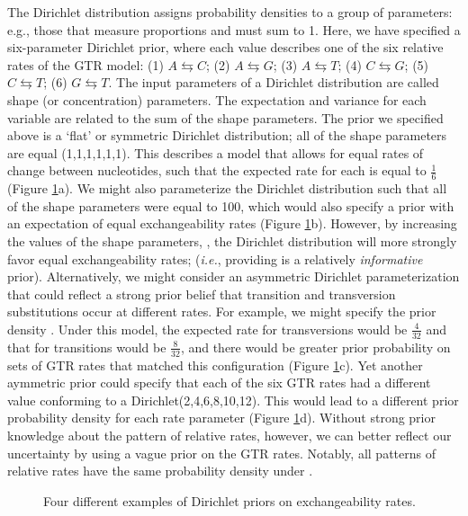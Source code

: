 The Dirichlet distribution assigns probability densities to a group of parameters: e.g., those that measure proportions and must sum to 1. 
Here, we have specified a six-parameter Dirichlet prior, where each value describes one of the six relative rates of the GTR model: 
(1) $A\leftrightarrows C$; (2) $A\leftrightarrows G$; (3) $A\leftrightarrows T$; (4) $C\leftrightarrows G$; (5) $C\leftrightarrows T$; (6) $G\leftrightarrows T$. 
The input 
parameters of a Dirichlet distribution are called shape (or concentration) parameters. 
The expectation and variance for each variable are related to the sum of the shape parameters.
The prior we specified above is a `flat' or symmetric Dirichlet distribution; all of the shape parameters are equal (1,1,1,1,1,1).
This describes a model that allows for equal rates of change between nucleotides, such that the expected rate for each is equal to $\frac{1}{6}$ (Figure \ref{dirichletFig}a).
We might also parameterize the Dirichlet distribution such that all of the shape parameters were equal to 100, which would also specify a prior with an expectation of equal exchangeability rates (Figure \ref{dirichletFig}b). 
However, by increasing the values of the shape parameters, , the Dirichlet distribution will more strongly favor equal exchangeability rates; ({\it i.e.}, providing is a relatively {\em informative} prior). 
Alternatively, we might consider an asymmetric Dirichlet parameterization that could reflect a strong prior belief that transition and transversion substitutions occur at different rates.
For example, we might specify the prior density .   
Under this model, the expected rate for transversions would be $\frac{4}{32}$ and that for transitions would be $\frac{8}{32}$, and there would be greater prior probability on sets of GTR rates that matched this configuration (Figure \ref{dirichletFig}c). 
Yet another aymmetric prior could specify that each of the six GTR rates had a different value conforming to a Dirichlet(2,4,6,8,10,12). 
This would lead to a different prior probability density for each rate parameter (Figure \ref{dirichletFig}d).
Without strong prior knowledge about the pattern of relative rates, however, we can better reflect our uncertainty by using a vague prior on the GTR rates. 
Notably, all patterns of relative rates have the same probability density under .
\begin{figure}[h!]
\centering
{}
\caption{\small Four different examples of Dirichlet priors on exchangeability rates.}
\label{dirichletFig}
\end{figure}


